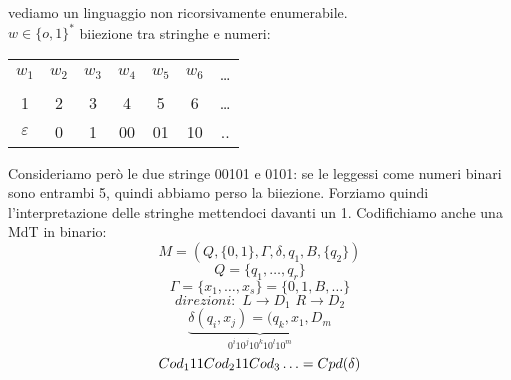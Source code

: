 	\begin{example}
		vediamo un linguaggio non ricorsivamente enumerabile.\\
		$w\in\{o,1\}^*$ biiezione tra stringhe e numeri:
		\begin{center}
			\begin{tabular}{c c c c c c c}
				$w_1$         & $w_2$ & $w_3$ & $w_4$ & $w_5$ & $w_6$ & \ldots  \\
				1             & 2     & 3     & 4     & 5     & 6     & \ldots  \\
				$\varepsilon$ & 0     & 1     & 00    & 01    & 10    & ..
			\end{tabular}
		\end{center}
		Consideriamo però le due stringe 00101 e 0101: se le leggessi come numeri binari sono entrambi
		5, quindi abbiamo perso la biiezione.
		Forziamo quindi l'interpretazione delle stringhe mettendoci davanti un 1.
		Codifichiamo anche una MdT in binario:
		$$M=(Q,\{0,1\},\Gamma,\delta,q_1,B,\{q_2\})$$
		$$Q=\{q_1,\ldots ,q_r\}$$
		$$\Gamma=\{x_1,\ldots ,x_s\}=\{0,1,B,\ldots \}$$
		$$direzioni:\,\,L\to D_1\,\,R\to D_2$$
		$$\underbrace{\delta(q_i,x_j)=(q_k,x_1,D_m}_{0^i10^j10^k10^l10^m}$$
		$$Cod_111Cod_211Cod_3\\\ldots =Cpd(\delta)$$
	\end{example}
